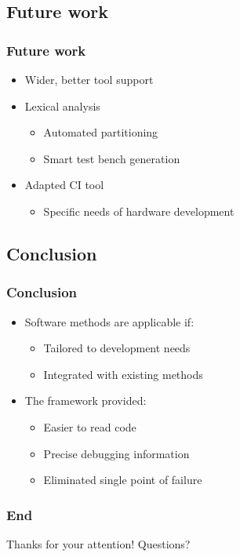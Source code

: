 \documentclass[british,10pt]{beamer}
\begin{document}
\subsection{Future work}

\begin{frame}\frametitle{Future work}
\begin{itemize}
\item Wider, better tool support
\item Lexical analysis
\begin{itemize}
\item Automated partitioning
\item Smart test bench generation
\end{itemize}
\item Adapted CI tool
\begin{itemize}
\item Specific needs of hardware development
\end{itemize}
\end{itemize}
\end{frame}

\subsection{Conclusion}

\begin{frame}\frametitle{Conclusion}
\begin{itemize}
\item Software methods are applicable if:
\begin{itemize}
\item Tailored to development needs
\item Integrated with existing methods
\end{itemize}
\vskip3pt
\item The framework provided:
\begin{itemize}
\item Easier to read code
\item Precise debugging information
\item Eliminated single point of failure
\end{itemize}
\end{itemize}
\end{frame}


\begin{frame}\frametitle{End}
\centering
\Large
Thanks for your attention!
\vskip20pt
Questions?
\end{frame}
\end{document}
